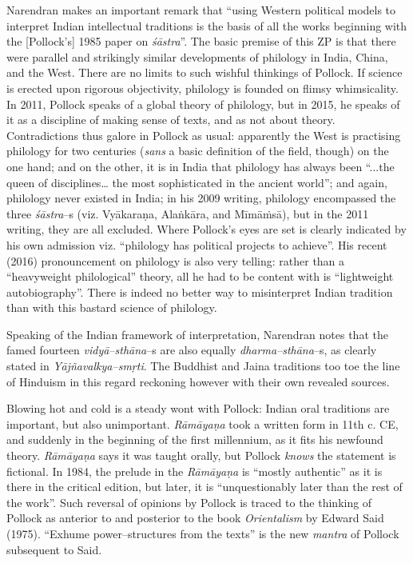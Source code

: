 {Narendran makes an important remark that “using Western political models to interpret Indian intellectual traditions is the basis of all the works beginning with the [Pollock’s] 1985 paper on \textit{śāstra}”. The basic premise of this ZP is that there were parallel and strikingly similar developments of philology in India, China, and the West. There are no limits to such wishful thinkings of Pollock. If science is erected upon rigorous objectivity, philology is founded on flimsy whimsicality. In 2011, Pollock speaks of a global theory of philology, but in 2015, he speaks of it as a discipline of making sense of texts, and as not about theory. Contradictions thus galore in Pollock as usual: apparently the West is practising philology for two centuries (\textit{sans} a basic definition of the field, though) on the one hand; and on the other, it is in India that philology has always been “...the queen of disciplines… the most sophisticated in the ancient world”; and again, philology never existed in India; in his 2009 writing, philology encompassed the three \textit{śāstra}–s (viz. Vyākaraṇa, Alaṅkāra, and Mīmāṁsā), but in the 2011 writing, they are all excluded. Where Pollock’s eyes are set is clearly indicated by his own admission viz. “philology has political projects to achieve”. His recent (2016) pronouncement on philology is also very telling: rather than a “heavyweight philological” theory, all he had to be content with is “lightweight autobiography”. There is indeed no better way to misinterpret Indian tradition than with this bastard science of philology.

Speaking of the Indian framework of interpretation, Narendran notes that the famed fourteen \textit{vidyā–sthāna}–s are also equally \textit{dharma–sthāna}–s, as clearly stated in \textit{Yājñavalkya–smṛti}. The Buddhist and Jaina traditions too toe the line of Hinduism in this regard reckoning however with their own revealed sources.

Blowing hot and cold is a steady wont with Pollock: Indian oral traditions are important, but also unimportant. \textit{Rāmāyaṇa} took a written form in 11th c. CE, and suddenly in the beginning of the first millennium, as it fits his newfound theory. \textit{Rāmāyaṇa} says it was taught orally, but Pollock \textit{knows} the statement is fictional. In 1984, the prelude in the \textit{Rāmāyaṇa} is “mostly authentic” as it is there in the critical edition, but later, it is “unquestionably later than the rest of the work”. Such reversal of opinions by Pollock is traced to the thinking of Pollock as anterior to and posterior to the book \textit{Orientalism} by Edward Said (1975). “Exhume power–structures from the texts” is the new \textit{mantra} of Pollock subsequent to Said.

}
